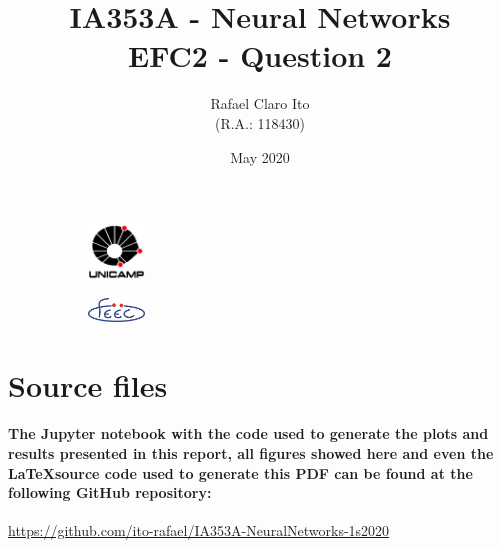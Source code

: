 \documentclass[a4paper]{article}    %
\begin{document}
\begin{figure}
    \centering
    \begin{subfigure}{0.45\textwidth}
        \centering
        \includegraphics[width=1.5cm]{unicamp}
    \end{subfigure}
    \hfill
    \begin{subfigure}{0.45\textwidth}
        \centering
        \includegraphics[width=1.5cm]{feec}
    \end{subfigure}
\end{figure}

\title{
    \vspace{5cm}
    IA353A - Neural Networks\\
    EFC2 - Question 2
    \vspace{1cm}
}
\author{
    Rafael Claro Ito\\
    (R.A.: 118430)
    \vspace{11cm}
}
\date{May 2020}
\maketitle
\newpage

\section{Source files}

\paragraph{The Jupyter notebook with the code used to generate the plots and results presented in this report, all figures showed here and even the \LaTeX \space source code used to generate this PDF can be found at the following GitHub repository:}

\begin{center}
    {\url{https://github.com/ito-rafael/IA353A-NeuralNetworks-1s2020}}
\end{center}
\end{document}

